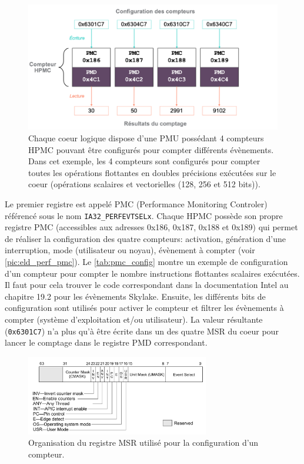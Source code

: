        \begin{figure}[h!]
        \center
        \includegraphics[width=14cm]{images/edl_perf_hpmc.png}
        \caption{\label{pic:edl_perf_hpmc} Chaque coeur logique dispose d'une PMU possédant 4 compteurs HPMC pouvant être configurés pour compter différents évènements. Dans cet exemple, les 4 compteurs sont configurés pour compter toutes les opérations flottantes en doubles précisions exécutées sur le coeur (opérations scalaires et vectorielles (128, 256 et 512 bits)).}
        \end{figure}
        
        Le premier registre est appelé PMC (Performance Monitoring Controler) référencé sous le nom \verb|IA32_PERFEVTSELx|. Chaque HPMC possède son propre registre PMC (accessibles aux adresses 0x186, 0x187, 0x188 et 0x189) qui permet de réaliser la configuration des quatre compteurs: activation, génération d'une interruption, mode (utilisateur ou noyau), évènement à compter (voir \autoref{pic:eld_perf_pmc}). Le \autoref{tab:pmc_config} montre un exemple de configuration d'un compteur pour compter le nombre instructions flottantes scalaires exécutées. Il faut pour cela trouver le code correspondant dans la documentation Intel \cite{Intel2018} au chapitre 19.2 pour les évènements Skylake. Ensuite, les différents bits de configuration sont utilisés pour activer le compteur et filtrer les évènements à compter (système d'exploitation et/ou utilisateur). La valeur résultante (\verb|0x6301C7|) n'a plus qu'à être écrite dans un des quatre MSR du coeur pour lancer le comptage dans le registre PMD correspondant.
        
        \begin{figure}
        \center
        \includegraphics[width=8cm]{images/eld_perf_pmc.png}
        \caption{\label{pic:eld_perf_pmc}Organisation du registre MSR utilisé pour la configuration d'un compteur.}
        \end{figure}
        
